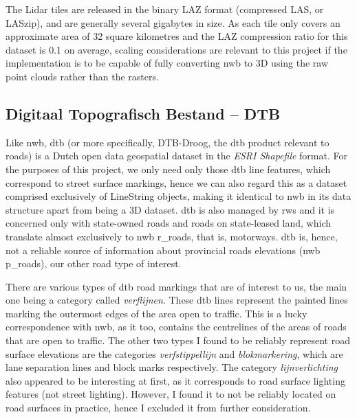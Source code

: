 The Lidar tiles are released in the binary LAZ format (compressed LAS, or LASzip), and are generally several gigabytes in size. As each tile only covers an approximate area of 32 square kilometres and the LAZ compression ratio for this dataset is 0.1 on average, scaling considerations are relevant to this project if the implementation is to be capable of fully converting \ac{nwb} to 3D using the raw point clouds rather than the rasters.

\subsection{Digitaal Topografisch Bestand – DTB}
\label{sub:dtb}

Like \ac{nwb}, \ac{dtb} (or more specifically, DTB-Droog, the \ac{dtb} product relevant to roads) is a Dutch open data geospatial dataset in the \textit{ESRI Shapefile} format. For the purposes of this project, we only need only those \ac{dtb} line features, which correspond to street surface markings, hence we can also regard this as a dataset comprised exclusively of LineString objects, making it identical to \ac{nwb} in its data structure apart from being a 3D dataset. \ac{dtb} is also managed by \ac{rws} and it is concerned only with state-owned roads and roads on state-leased land, which translate almost exclusively to \ac{nwb} \ac{r_roads}, that is, motorways. \ac{dtb} is, hence, not a reliable source of information about provincial roads elevations (\ac{nwb} \ac{p_roads}), our other road type of interest.

There are various types of \ac{dtb} road markings that are of interest to us, the main one being a category called \textit{verflijnen}. These \ac{dtb} lines represent the painted lines marking the outermost edges of the area open to traffic. This is a lucky correspondence with \ac{nwb}, as it too, contains the centrelines of the areas of roads that are open to traffic. The other two types I found to be reliably represent road surface elevations are the categories \textit{verfstippellijn} and \textit{blokmarkering}, which are lane separation lines and block marks respectively. The category \textit{lijnverlichting} also appeared to be interesting at first, as it corresponds to road surface lighting features (not street lighting). However, I found it to not be reliably located on road surfaces in practice, hence I excluded it from further consideration.


